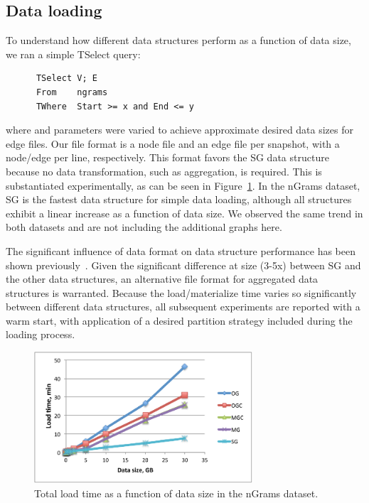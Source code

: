 \subsection{Data loading}

To understand how different data structures perform as a function of
data size, we ran a simple TSelect query:

\begin{small}
\begin{verbatim}
      TSelect V; E
      From    ngrams
      TWhere  Start >= x and End <= y
\end{verbatim}
\end{small}

\noindent where  and  parameters were varied to
achieve approximate desired data sizes for edge files.  Our file
format is a node file and an edge file per snapshot, with a node/edge
per line, respectively.  This format favors the SG data structure
because no data transformation, such as aggregation, is required.
This is substantiated experimentally, as can be seen in
Figure~\ref{fig:tselect}.  In the nGrams dataset, SG is the fastest
data structure for simple data loading, although all structures
exhibit a linear increase as a function of data size.  We observed the
same trend in both datasets and are not including the additional
graphs here. 

The significant influence of data format on data structure performance
has been shown previously~\cite{DBLP:journals/tos/MiaoHLWYZPCC15}.
Given the significant difference at size (3-5x) between SG and the
other data structures, an alternative file format for aggregated data
structures is warranted.  Because the load/materialize time varies so
significantly between different data structures, all subsequent
experiments are reported with a warm start, with application of a
desired partition strategy included during the loading process.

\begin{figure}[t]
\includegraphics[width=3.2in]{figs/tselect.pdf}
\caption{Total load time as a function of data size in the nGrams
  dataset.}
\label{fig:tselect}
\end{figure}

